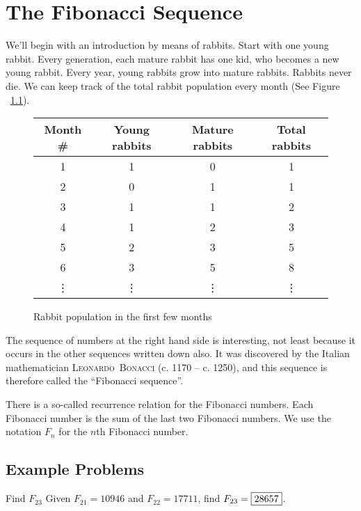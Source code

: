 \documentclass[a4paper,10pt]{report}
\begin{document}
\chapter{The Fibonacci Sequence}

We'll begin with an introduction by means of rabbits. Start with one young
rabbit. Every generation, each mature rabbit has one kid, who becomes a new
young rabbit. Every year, young rabbits grow into mature rabbits. Rabbits never
die. We can keep track of the total rabbit population every month (See Figure
~\ref{fib:rabbit}).

\begin{figure}
 \begin{tabular}{|c|c|c|c|}
  \hline
  Month \# & Young rabbits & Mature rabbits & Total rabbits \\
  \hline
  1 & 1 & 0 & 1 \\
  2 & 0 & 1 & 1 \\
  3 & 1 & 1 & 2 \\
  4 & 1 & 2 & 3 \\
  5 & 2 & 3 & 5 \\
  6 & 3 & 5 & 8 \\
  \vdots & \vdots & \vdots & \vdots \\
  \hline
 \end{tabular}

 \caption{Rabbit population in the first few months}

 \label{fib:rabbit}
\end{figure}

The sequence of numbers at the right hand side is interesting, not least
because it occurs in the other sequences written down also. It was discovered
by the Italian mathematician \textsc{Leonardo~Bonacci} (c. 1170 -- c. 1250),
and this sequence is therefore called the ``Fibonacci sequence''.

There is a so-called recurrence relation for the Fibonacci numbers. Each
Fibonacci number is the sum of the last two Fibonacci numbers. We use the
notation \(F_n\) for the \(n\)th Fibonacci number.

\section{Example Problems}

\begin{problem}{Find \(F_{23}\)}
 Given \(F_{21}=10946\) and \(F_{22}=17711\), find \(F_{23}=\Ans{28657}\).
\end{problem}
\end{document}

